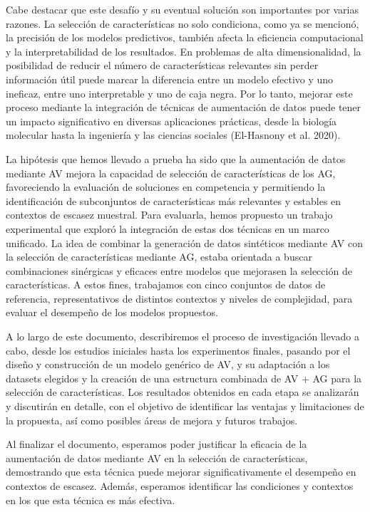 Cabe destacar que este desafío y su eventual solución son importantes por varias razones. La selección de características no solo condiciona, como ya se mencionó, la precisión de los modelos predictivos, también afecta la eficiencia computacional y la interpretabilidad de los resultados. En problemas de alta dimensionalidad, la posibilidad de reducir el número de características relevantes sin perder información útil puede marcar la diferencia entre un modelo efectivo y uno ineficaz, entre uno interpretable y uno de caja negra. Por lo tanto, mejorar este proceso mediante la integración de técnicas de aumentación de datos puede tener un impacto significativo en diversas aplicaciones prácticas, desde la biología molecular hasta la ingeniería y las ciencias sociales (El-Hasnony et al. 2020).

La hipótesis que hemos llevado a prueba ha sido que la aumentación de datos mediante AV mejora la capacidad de selección de características de los AG, favoreciendo la evaluación de soluciones en competencia y permitiendo la identificación de subconjuntos de características más relevantes y estables en contextos de escasez muestral. Para evaluarla, hemos propuesto un trabajo experimental que exploró la integración de estas dos técnicas en un marco unificado. La idea de combinar la generación de datos sintéticos mediante AV con la selección de características mediante AG, estaba orientada a buscar combinaciones sinérgicas y eficaces entre modelos que mejorasen la selección de características. A estos fines, trabajamos con cinco conjuntos de datos de referencia, representativos de distintos contextos y niveles de complejidad, para evaluar el desempeño de los modelos propuestos.

A lo largo de este documento, describiremos el proceso de investigación llevado a cabo, desde los estudios iniciales hasta los experimentos finales, pasando por el diseño y construcción de un modelo genérico de AV, y su adaptación a los datasets elegidos y la creación de una estructura combinada de AV + AG para la selección de características. Los resultados obtenidos en cada etapa se analizarán y discutirán en detalle, con el objetivo de identificar las ventajas y limitaciones de la propuesta, así como posibles áreas de mejora y futuros trabajos.

Al finalizar el documento, esperamos poder justificar la eficacia de la aumentación de datos mediante AV en la selección de características, demostrando que esta técnica puede mejorar significativamente el desempeño en contextos de escasez. Además, esperamos identificar las condiciones y contextos en los que esta técnica es más efectiva.


